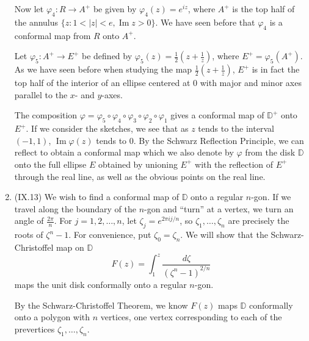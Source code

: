 \documentclass[11pt]{book}
\theoremstyle{definition}
\renewcommand{\Im}{\operatorname{Im}}
\begin{document}
\begin{enumerate}
    Now let $\varphi_4 : R \to A^+$ be given by $\varphi_4 (z) = e^{iz}$, where $A^+$ is the top half of the annulus $\{ z : 1 < |z| < e , \Im z > 0 \}$.  We have seen before that $\varphi_4$ is a conformal map from $R$ onto $A^+$.

    Let $\varphi_5 : A^+ \to E^+$ be defined by $\varphi_5(z) = \frac{1}{2} \left( z + \frac 1 z \right)$, where $E^+ = \varphi_5(A^+)$.  As we have seen before when studying the map $\frac{1}{2} \left( z + \frac 1 z \right)$, $E^+$ is in fact the top half of the interior of an ellipse centered at $0$ with major and minor axes parallel to the $x$- and $y$-axes.  

    The composition $\varphi = \varphi_5 \circ \varphi_4 \circ \varphi_3 \circ \varphi_2 \circ \varphi_1$ gives a conformal map of $\mathbb D^+$ onto $E^+$.  If we consider the sketches, we see that as $z$ tends to the interval $(-1,1)$, $\Im \varphi(z)$ tends to $0$.  By the Schwarz Reflection Principle, we can reflect to obtain a conformal map  which we also denote by $\varphi$ from the disk $\mathbb D$ onto the full ellipse $E$ obtained by unioning $E^+$ with the reflection of $E^+$ through the real line, as well as the obvious points on the real line.  
    



  \item (IX.13) We wish to find a conformal map of $\mathbb D$ onto a regular $n$-gon.  If we travel along the boundary of the $n$-gon and ``turn'' at a vertex, we turn an angle of $\tfrac{2\pi}{n}$.  For $j=1,2,\ldots, n$, let $\zeta_j = e^{2\pi i j /n}$, so $\zeta_1, \ldots, \zeta_n$ are precisely the roots of $\zeta^n - 1$.  For convenience, put $\zeta_0 = \zeta_n$.  We will show that the Schwarz-Christoffel map on $\mathbb D$
    \[ F(z) = \int_1^z \frac{d\zeta}{(\zeta^n - 1)^{2/n}} \] maps the unit disk conformally onto a regular $n$-gon.  
    
    By the Schwarz-Christoffel Theorem, we know $F(z)$ maps $\mathbb D$ conformally onto a polygon with $n$ vertices, one vertex corresponding to each of the prevertices $\zeta_1, \ldots, \zeta_n$. 


\end{enumerate}
\end{document}
